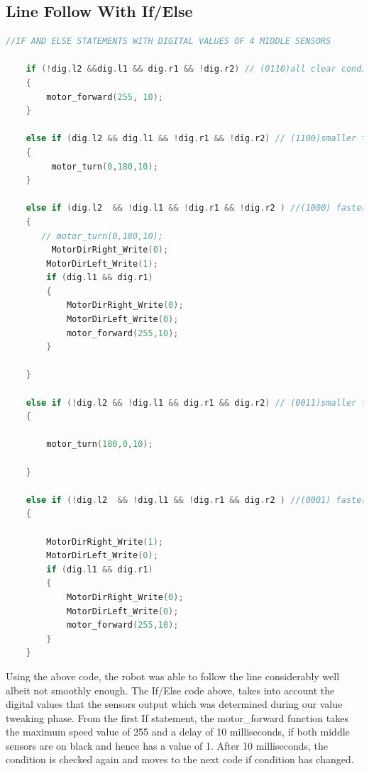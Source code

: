 \documentclass[11pt,a4paper,oneside,article]{memoir}
\begin{document}
\subsection{Line Follow With If/Else}
\vspace{-22pt}\begin{lstlisting}[language=C,caption={If/Else Line Follow},label=follow.c] 
 //IF AND ELSE STATEMENTS WITH DIGITAL VALUES OF 4 MIDDLE SENSORS
       
    if (!dig.l2 &&dig.l1 && dig.r1 && !dig.r2) // (0110)all clear condition
    {
        motor_forward(255, 10);
    }
    
    else if (dig.l2 && dig.l1 && !dig.r1 && !dig.r2) // (1100)smaller turn here to the left
    {
         motor_turn(0,180,10);
    }
    
    else if (dig.l2  && !dig.l1 && !dig.r1 && !dig.r2 ) //(1000) faster turn to the left
    {
       // motor_turn(0,180,10);
         MotorDirRight_Write(0);
        MotorDirLeft_Write(1);
        if (dig.l1 && dig.r1)
        {
            MotorDirRight_Write(0);
            MotorDirLeft_Write(0);
            motor_forward(255,10);
        }
        
    }
    
    else if (!dig.l2 && !dig.l1 && dig.r1 && dig.r2) // (0011)smaller turn here to the right
    {
        
        motor_turn(180,0,10);
        
    }
    
    else if (!dig.l2  && !dig.l1 && !dig.r1 && dig.r2 ) //(0001) faster turn to the right
    {
       
        MotorDirRight_Write(1);
        MotorDirLeft_Write(0);
        if (dig.l1 && dig.r1)
        {
            MotorDirRight_Write(0);
            MotorDirLeft_Write(0);
            motor_forward(255,10);
        }
    } 
\end{lstlisting}\vspace{-22pt}
Using the above code, the robot was able to follow the line considerably well albeit not smoothly enough. The If/Else code above, takes into account the digital values that the sensors output which was determined during our value tweaking phase. From the first If statement, the motor\_forward function takes the maximum speed value of 255 and a delay of 10 milliseconds, if both middle sensors are on black and hence has a value of 1. After 10 milliseconds, the condition is checked again and moves to the next code if condition has changed. 
\end{document}
